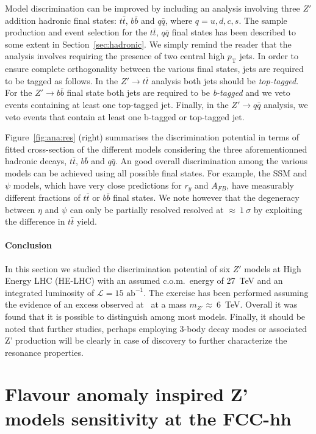 \documentclass[a4paper,11pt]{article}
\newcommand{\pt}{\ensuremath{p_{\text{T}}}}
\newcommand*{\intlumihelhc}{\ensuremath{\mathcal{L}=15\text{ ab}^{-1}}}
\newcommand*{\com}{c.o.m.~}
\begin{document}
Model discrimination can be improved by including an analysis involving three $Z'$ addition hadronic final states: $t\bar{t}$, $b\bar{b}$ and $q\bar{q}$, where $q=u,d,c,s$. The sample production and event selection for the $t\bar{t}$, $q\bar{q}$ final states has been described to some extent in Section~\ref{sec:hadronic}. We simply remind the reader that the analysis involves requiring the presence of two central high $\pt$ jets. In order to ensure complete orthogonality between the various final states, jets are required to be tagged as follows. In the $Z' \rightarrow t\bar{t}$ analysis both jets should be \emph{top-tagged}. For the $Z' \rightarrow b\bar{b}$ final state both jets are required to be \emph{b-tagged} and we veto events containing at least one top-tagged jet. Finally, in the $Z' \rightarrow q\bar{q}$ analysis, we veto events that contain at least one b-tagged or top-tagged jet.

Figure~\ref{fig:ana:res} (right) summarises the discrimination potential in terms of fitted cross-section of the different models considering the three aforementionned hadronic decays, $t\bar{t}$,  $b\bar{b}$ and $q\bar{q}$. An good overall discrimination among the various models can be achieved using all possible final states. For example, the SSM and $\psi$ models, which have very close predictions for $r_y$ and $A_{FB}$, have measurably different fractions of $t\bar{t}$ or $b\bar{b}$ final states. We note however that the degeneracy between $\eta$ and $\psi$ can only be partially resolved resolved at $\approx~1~\sigma$ by exploiting the difference in $t\bar{t}$ yield.

\paragraph*{Conclusion}
In this section we studied the discrimination potential of six $Z'$ models at High Energy LHC (HE-LHC) with an assumed \com energy of 27~TeV and an integrated luminosity of \intlumihelhc. The exercise has been performed assuming the evidence of an excess observed at \sqrtslhc\ at a mass $m_{Z'}\approx~6$~TeV. Overall it was found that it is possible to distinguish among most models. Finally, it should be noted that further studies, perhaps employing 3-body decay modes or associated Z' production will be clearly in case of discovery to further characterize the resonance properties.


\section{Flavour anomaly inspired Z' models sensitivity at the FCC-hh}
\label{sec:zprimeflav}
\end{document}
